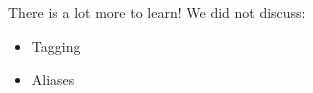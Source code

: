 
\begin{frame}
There is a lot more to learn! We did not discuss:
\begin{itemize}
\item Tagging
\item Aliases
\end{itemize}
\end{frame}

\frame{
\frametitle{\large{}}
	\huge{\center{\color{RUBblau}{Thank you for your attention.}}}
}


